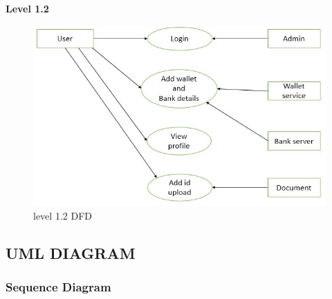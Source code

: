 \documentclass[12pt]{article}
\begin{document}
\begin{flushleft}\textbf{Level 1.2}\end{flushleft}


\begin{figure}[h!]
\begin{center}
\includegraphics[scale=.9]{DFD1.2}
\caption{level 1.2 DFD}
\end{center}
\end{figure}








\newpage





\subsection{UML DIAGRAM}

\subsubsection{Sequence Diagram}
\end{document}
